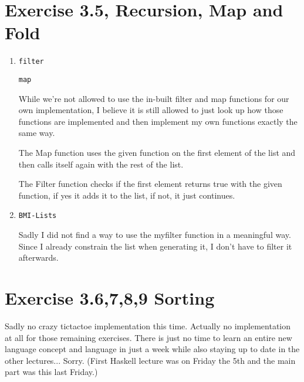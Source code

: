\documentclass{article} %
\newcommand{\homeworkNumber}{3} %
\begin{document}
\section*{Exercise 3.5, Recursion, Map and Fold}

\begin{enumerate}
\item \verb|filter|
\lstset{language=Haskell}


\verb|map|
\lstset{language=Haskell}


While we're not allowed to use the in-built filter and map functions for our own implementation, I believe it is still allowed to just look up how those functions are implemented and then implement my own functions exactly the same way.

The Map function uses the given function on the first element of the list and then calls itself again with the rest of the list.

The Filter function checks if the first element returns true with the given function, if yes it adds it to the list, if not, it just continues.

\item \verb|BMI-Lists|
\lstset{language=Haskell}


Sadly I did not find a way to use the myfilter function in a meaningful way. Since I already constrain the list when generating it, I don't have to filter it afterwards.

\end{enumerate}

\clearpage

\section*{Exercise \homeworkNumber.6,7,8,9 Sorting}

Sadly no crazy tictactoe implementation this time. Actually no implementation at all for those remaining exercises. There is just no time to learn an entire new language concept and language in just a week while also staying up to date in the other lectures... Sorry. (First Haskell lecture was on Friday the 5th and the main part was this last Friday.)
\end{document}

